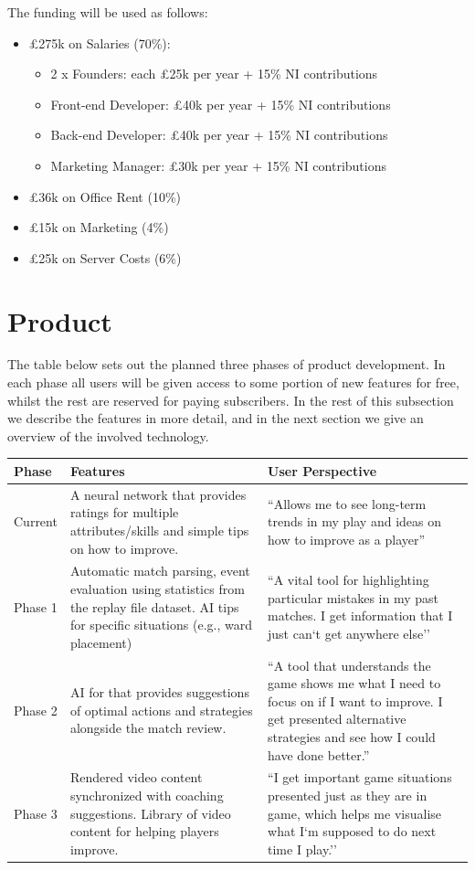 \documentclass[12pt]{article} %
\let\oldsection\section
\renewcommand\section{\clearpage\oldsection}
\begin{document}
The funding will be used as follows:

\begin{itemize}
\item \pounds275k on Salaries (70\%):
\begin{itemize}
\item 2 x Founders: each \pounds25k per year + 15\% NI contributions
\item Front-end Developer: \pounds40k per year + 15\% NI contributions
\item Back-end Developer: \pounds40k per year + 15\% NI contributions
\item Marketing Manager: \pounds30k per year + 15\% NI contributions
\end{itemize}
\item \pounds36k on Office Rent (10\%)
\item \pounds15k on Marketing (4\%)
\item \pounds25k on Server Costs (6\%)
\end{itemize}

\section{Product}

The table below sets out the planned three phases of product development. In each phase all users will be given access to some portion of new features for free, whilst the rest are reserved for paying subscribers. In the rest of this subsection we describe the features in more detail, and in the next section we give an overview of the involved technology.

\begin{center}
\onehalfspacing
    \begin{tabular}{ | l | p{6cm} | p{6cm} |}
    \hline
    Phase & Features  & User Perspective\\ \hline
    Current & A neural network that provides ratings for multiple attributes/skills and simple tips on how to improve.
 &``Allows me to see long-term trends in my play and ideas on how to improve as a player''\\  \hline
    Phase 1 & Automatic match parsing, event evaluation using statistics from the replay file dataset. AI tips for specific situations (e.g., ward placement)
 & ``A vital tool for highlighting particular mistakes in my past matches. I get information that I just can`t get anywhere else'' \\ \hline
    Phase 2 & AI for that provides suggestions of optimal actions and strategies alongside the match review.  & ``A tool that understands the game shows me what I need to focus on if I want to improve. I get presented alternative strategies and see how I could have done better.''  \\
    \hline
     Phase 3 & Rendered video content synchronized with coaching suggestions. Library of video content for helping players improve. & ``I get important game situations presented just as they are in game, which helps me visualise what I`m supposed to do next time I play.'' \\
    \hline
    \end{tabular}
\end{center}
\pagebreak
\end{document}
